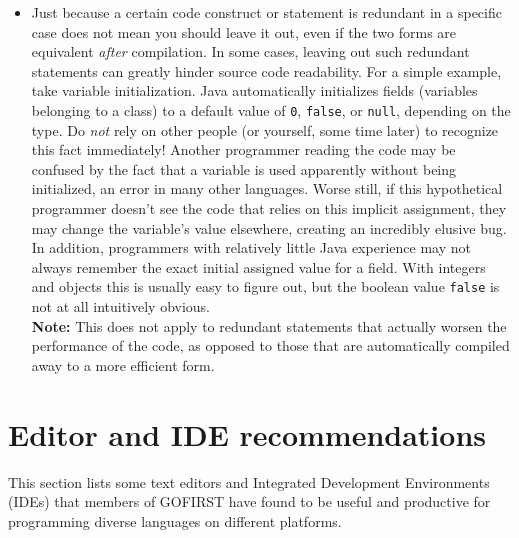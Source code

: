 \documentclass[12pt]{article}
\newcommand{\code}[1]{\texttt{#1}}
\begin{document}
\begin{itemize}
    \item Just because a certain code construct or statement is redundant in a specific case does not mean you should leave it out, even if the two forms are equivalent \emph{after} compilation. In some cases, leaving out such redundant statements can greatly hinder source code readability. For a simple example, take variable initialization. Java automatically initializes fields (variables belonging to a class) to a default value of \code{0}, \code{false}, or \code{null}, depending on the type. Do \emph{not} rely on other people (or yourself, some time later) to recognize this fact immediately! Another programmer reading the code may be confused by the fact that a variable is used apparently without being initialized, an error in many other languages. Worse still, if this hypothetical programmer doesn't see the code that relies on this implicit assignment, they may change the variable's value elsewhere, creating an incredibly elusive bug. In addition, programmers with relatively little Java experience may not always remember the exact initial assigned value for a field. With integers and objects this is usually easy to figure out, but the boolean value \code{false} is not at all intuitively obvious.\\
        \textbf{Note:} This does not apply to redundant statements that actually worsen the performance of the code, as opposed to those that are automatically compiled away to a more efficient form. 
\end{itemize}

\appendix
\section{Editor and IDE recommendations}
\label{sec:editors}
This section lists some text editors and Integrated Development Environments (IDEs) that members of GOFIRST have found to be useful and productive for programming diverse languages on different platforms.
\end{document}
